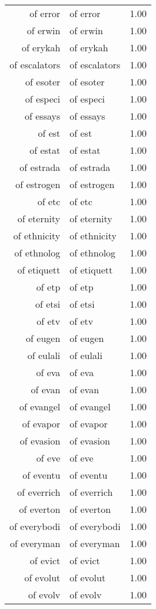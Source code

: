 \begin{table}[ht]
\begin{tabular}{rlr}
  of error & of error & 1.00 \\ 
  of erwin & of erwin & 1.00 \\ 
  of erykah & of erykah & 1.00 \\ 
  of escalators & of escalators & 1.00 \\ 
  of esoter & of esoter & 1.00 \\ 
  of especi & of especi & 1.00 \\ 
  of essays & of essays & 1.00 \\ 
  of est & of est & 1.00 \\ 
  of estat & of estat & 1.00 \\ 
  of estrada & of estrada & 1.00 \\ 
  of estrogen & of estrogen & 1.00 \\ 
  of etc & of etc & 1.00 \\ 
  of eternity & of eternity & 1.00 \\ 
  of ethnicity & of ethnicity & 1.00 \\ 
  of ethnolog & of ethnolog & 1.00 \\ 
  of etiquett & of etiquett & 1.00 \\ 
  of etp & of etp & 1.00 \\ 
  of etsi & of etsi & 1.00 \\ 
  of etv & of etv & 1.00 \\ 
  of eugen & of eugen & 1.00 \\ 
  of eulali & of eulali & 1.00 \\ 
  of eva & of eva & 1.00 \\ 
  of evan & of evan & 1.00 \\ 
  of evangel & of evangel & 1.00 \\ 
  of evapor & of evapor & 1.00 \\ 
  of evasion & of evasion & 1.00 \\ 
  of eve & of eve & 1.00 \\ 
  of eventu & of eventu & 1.00 \\ 
  of everrich & of everrich & 1.00 \\ 
  of everton & of everton & 1.00 \\ 
  of everybodi & of everybodi & 1.00 \\ 
  of everyman & of everyman & 1.00 \\ 
  of evict & of evict & 1.00 \\ 
  of evolut & of evolut & 1.00 \\ 
  of evolv & of evolv & 1.00 \\ 

\end{tabular}
\end{table}
